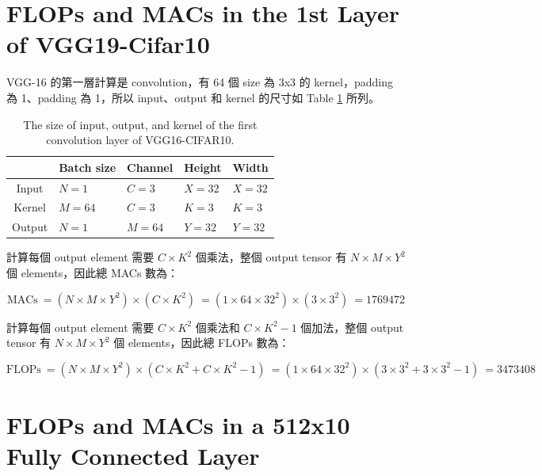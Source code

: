 \documentclass[12pt]{article}
\begin{document}
\section{FLOPs and MACs in the 1st Layer of VGG19-Cifar10}

VGG-16 的第一層計算是 convolution，有 64 個 size 為 3x3 的 kernel，padding 為 1、padding 為 1，所以 input、output 和 kernel 的尺寸如 Table \ref{tab:conv} 所列。

\begin{table}[h]
    \centering
    \caption{The size of input, output, and kernel of the first convolution layer of VGG16-CIFAR10.}
    \begin{tabular}{cllll} \hline
           & Batch size & Channel & Height  & Width   \\ \hline
    Input  & $N=1$      & $C=3$   & $X=32$  & $X=32$  \\
    Kernel & $M=64$     & $C=3$   & $K=3$   & $K=3$   \\
    Output & $N=1$      & $M=64$  & $Y=32$  & $Y=32$  \\ \hline
    \end{tabular}
    \label{tab:conv}
\end{table}


計算每個 output element 需要 $C \times K^2$ 個乘法，整個 output tensor 有 $N \times M \times Y^2$ 個 elements，因此總 MACs 數為：

$$
\text{MACs} \
= (N \times M \times Y^2) \times (C \times K^2) \
= (1 \times 64 \times 32^2) \times (3 \times 3^2) \
= 1769472
$$

計算每個 output element 需要 $C \times K^2$ 個乘法和 $C \times K^2 - 1$ 個加法，整個 output tensor 有 $N \times M \times Y^2$ 個 elements，因此總 FLOPs 數為：

$$
\text{FLOPs} \
= (N \times M \times Y^2) \times (C \times K^2 + C \times K^2 - 1) \
= (1 \times 64 \times 32^2) \times (3 \times 3^2 + 3 \times 3^2 - 1) \
= 3473408
$$

\section{FLOPs and MACs in a 512x10 Fully Connected Layer}
\end{document}

